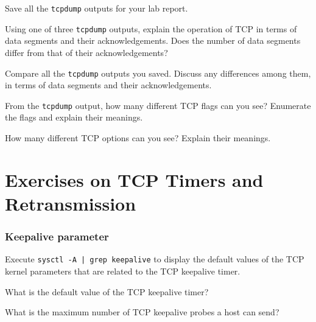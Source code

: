 \documentclass{../UTNetLab}
\begin{document}
    Save all the \lstinline{tcpdump} outputs for your lab report.
    
    \begin{report}
        \item Using one of three \lstinline{tcpdump} outputs, explain the operation of TCP in terms of data segments and their acknowledgements.
                Does the number of data segments differ from that of their acknowledgements?

            Compare all the \lstinline{tcpdump} outputs you saved.
            Discuss any differences among them, in terms of data segments and their acknowledgements.
        
        \item From the \lstinline{tcpdump} output, how many different TCP flags can you see? Enumerate the flags and explain their meanings.

            How many different TCP options can you see?
            Explain their meanings.
    \end{report}

\part{Exercises on TCP Timers and Retransmission}
\section{Keepalive parameter}
    Execute \lstinline{sysctl -A | grep keepalive} to display the default values of the TCP kernel parameters that are related to the TCP keepalive timer.

    \begin{report}
        \item What is the default value of the TCP keepalive timer?
        
        \item What is the maximum number of TCP keepalive probes a host can send?
    \end{report}
\end{document}
